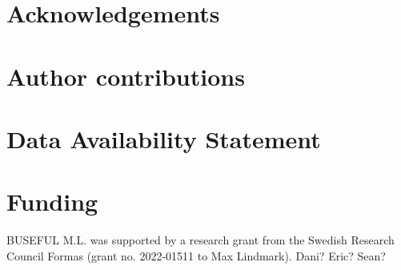 \documentclass[11pt]{article}
\begin{document}
\begin{spacing}{1.5}




\section{Acknowledgements}

\section{Author contributions}

\section{Data Availability Statement}

\section{Funding}
BUSEFUL
M.L. was supported by a research grant from the Swedish Research Council Formas (grant no. 2022-01511 to Max Lindmark).
Dani? Eric? Sean? 

\end{spacing}




\clearpage

\renewcommand{\thefigure}{S\arabic{figure}}
\renewcommand{\thetable}{S\arabic{table}}
\setcounter{figure}{0}
\setcounter{table}{0}
\onehalfspacing
\linenumbers
\resetlinenumber
\setcounter{secnumdepth}{0}
\setcounter{page}{1}
\setcounter{equation}{0}
\nolinenumbers
{}
\end{document}
